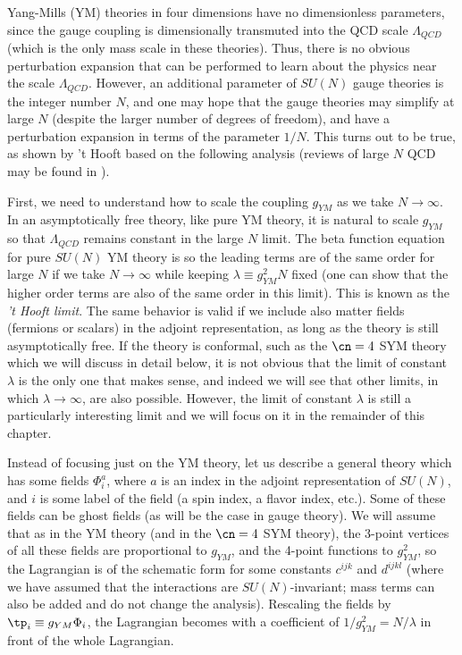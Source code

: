 Yang-Mills (YM) theories in four dimensions have no dimensionless
parameters, since the gauge coupling is dimensionally transmuted into
the QCD scale $\Lambda_{QCD}$ (which is the only mass scale in these
theories). Thus, there is no obvious perturbation expansion that can
be performed to learn about the physics near the scale
$\Lambda_{QCD}$. However, an additional parameter of $SU(N)$ gauge
theories is the integer number $N$, and one may hope that the gauge
theories may simplify at large $N$ (despite the larger number of
degrees of freedom), and have a perturbation expansion in terms of the
parameter $1/N$. This turns out to be true, as shown by 't Hooft based
on the following analysis (reviews of large $N$ QCD may be found in 
\cite{Coleman:1980nk,Manohar:1998xv}).

First, we need to understand how to scale the coupling $g_{YM}$ as we
take $N \to \infty$. In an asymptotically free theory, like pure YM
theory, it is natural to scale $g_{YM}$ so that $\Lambda_{QCD}$
remains constant in the large $N$ limit. The beta function equation
for pure $SU(N)$ YM theory is
so the leading terms are of the same order for large $N$ if we take
$N \to \infty$ while keeping $\lambda \equiv g_{YM}^2 N$ fixed (one
can show that the higher order terms are also of the same order in
this limit). This is known as the {\it 't Hooft limit}. 
The same behavior is valid if we include also matter
fields (fermions or scalars) in the adjoint representation, as long as
the theory is still asymptotically free. If the theory is conformal,
such as the $\cn=4$ SYM theory which we will discuss in detail below,
it is not obvious that the limit of constant $\lambda$ is the only one
that makes sense, and indeed we will see that other limits, in which
$\lambda \to \infty$, are also possible. However, the limit of constant
$\lambda$ is still a particularly interesting limit
and we will focus on it in the remainder of this chapter.

Instead of focusing just on the YM theory, let us describe a general
theory which has some fields $\Phi_i^a$, where $a$ is an index in the
adjoint representation of $SU(N)$, and $i$ is some label of the field
(a spin index, a flavor index, etc.). Some of these fields can be
ghost fields (as will be the case in gauge theory). We will assume
that as in the YM theory (and in the $\cn=4$ SYM theory), the 3-point
vertices of all these fields are proportional to $g_{YM}$, and the
4-point functions to $g_{YM}^2$, so the Lagrangian is of the schematic
form 
for some constants $c^{ijk}$ and $d^{ijkl}$
(where we have assumed that the interactions are
$SU(N)$-invariant; mass terms can also be added and do not change the 
analysis). Rescaling the fields by $\tp_i \equiv g_{YM} \Phi_i$,
the Lagrangian becomes 
with a coefficient of $1/ g_{YM}^2 = N/ \lambda$ in front
of the whole Lagrangian.

